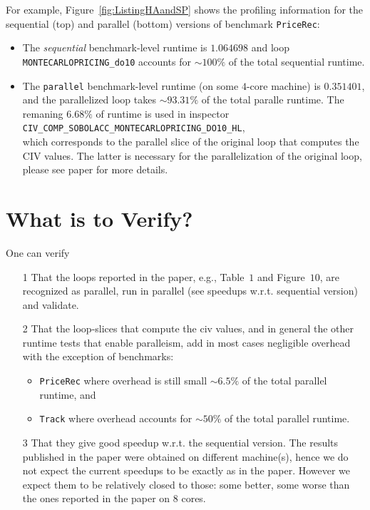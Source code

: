 \documentclass{sig-alternate}
\begin{document}
For example, Figure~\ref{fig:ListingHAandSP} shows the profiling information
for the sequential (top) and parallel (bottom) versions of benchmark {\tt PriceRec}:
\begin{itemize}
    \item The {\em sequential} benchmark-level runtime is $1.064698$ and loop 
        {\tt MONTECARLOPRICING\_do10} accounts for $\sim 100\%$ 
        of the total sequential runtime. 

    \item The {\tt parallel} benchmark-level runtime (on some $4$-core machine) is 
            $0.351401$, and the parallelized loop takes $\sim 93.31\%$ 
            of the total paralle runtime. The remaning $6.68\%$ of runtime is used 
            in inspector\\ {\tt CIV\_COMP\_SOBOLACC\_MONTECARLOPRICING\_DO10\_HL},\\
            which corresponds to the parallel slice of the original loop that computes the
            CIV values. The latter is necessary for the parallelization of the original loop,
            please see paper for more details.
\end{itemize}



\section{What is to Verify?}

One can verify
\begin{itemize}
    \item[1] That the loops reported in the paper, e.g., Table~$1$ and Figure~$10$, 
        are recognized as parallel, run in parallel (see speedups w.r.t. sequential 
        version) and validate.

    \item[2] That the loop-slices that compute the {\sc civ} values, and in general
                the other runtime tests that enable paralleism, add in most
        cases negligible overhead with the exception of benchmarks:
        \begin{itemize}
            \item  {\tt PriceRec} where overhead is still small $\sim 6.5\%$ of the
                    total parallel runtime, and
            \item {\tt Track} where overhead accounts for $\sim 50\%$ of the total
                parallel runtime.
        \end{itemize}

    \item[3] That they give good speedup w.r.t. the sequential version. 
        The results published in the paper were obtained on different machine(s),
        hence we do not expect the current speedups to be exactly as in the paper.
        However we expect them to be relatively closed to those:
        some better, some worse than the ones reported in the paper on 8 cores.
\end{itemize}
\end{document}
